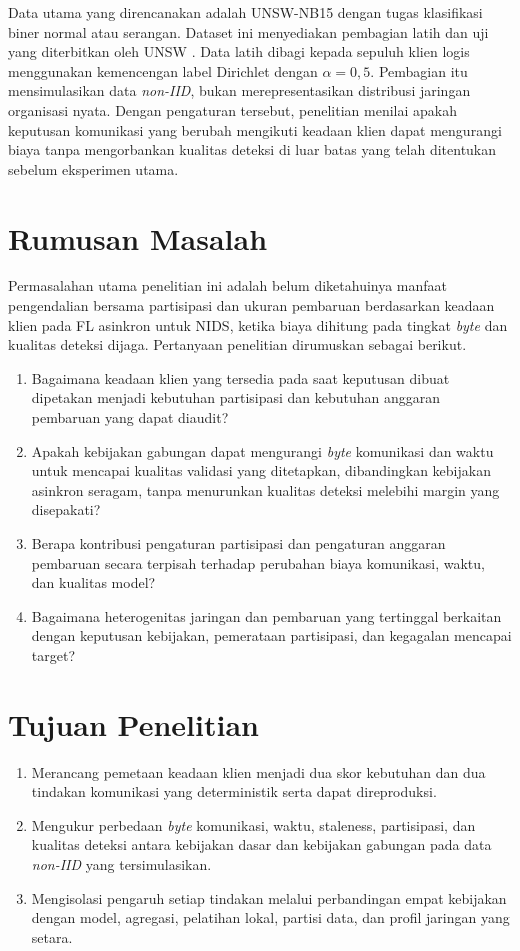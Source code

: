 Data utama yang direncanakan adalah UNSW-NB15 dengan tugas klasifikasi biner normal atau serangan. Dataset ini menyediakan pembagian latih dan uji yang diterbitkan oleh UNSW \cite{moustafa2015,unswdata}. Data latih dibagi kepada sepuluh klien logis menggunakan kemencengan label Dirichlet dengan $\alpha=0{,}5$. Pembagian itu mensimulasikan data \textit{non-IID}, bukan merepresentasikan distribusi jaringan organisasi nyata. Dengan pengaturan tersebut, penelitian menilai apakah keputusan komunikasi yang berubah mengikuti keadaan klien dapat mengurangi biaya tanpa mengorbankan kualitas deteksi di luar batas yang telah ditentukan sebelum eksperimen utama.

\section{Rumusan Masalah}
Permasalahan utama penelitian ini adalah belum diketahuinya manfaat pengendalian bersama partisipasi dan ukuran pembaruan berdasarkan keadaan klien pada FL asinkron untuk NIDS, ketika biaya dihitung pada tingkat \textit{byte} dan kualitas deteksi dijaga. Pertanyaan penelitian dirumuskan sebagai berikut.
\begin{enumerate}
  \item Bagaimana keadaan klien yang tersedia pada saat keputusan dibuat dipetakan menjadi kebutuhan partisipasi dan kebutuhan anggaran pembaruan yang dapat diaudit?
  \item Apakah kebijakan gabungan dapat mengurangi \textit{byte} komunikasi dan waktu untuk mencapai kualitas validasi yang ditetapkan, dibandingkan kebijakan asinkron seragam, tanpa menurunkan kualitas deteksi melebihi margin yang disepakati?
  \item Berapa kontribusi pengaturan partisipasi dan pengaturan anggaran pembaruan secara terpisah terhadap perubahan biaya komunikasi, waktu, dan kualitas model?
  \item Bagaimana heterogenitas jaringan dan pembaruan yang tertinggal berkaitan dengan keputusan kebijakan, pemerataan partisipasi, dan kegagalan mencapai target?
\end{enumerate}

\section{Tujuan Penelitian}
\begin{enumerate}
  \item Merancang pemetaan keadaan klien menjadi dua skor kebutuhan dan dua tindakan komunikasi yang deterministik serta dapat direproduksi.
  \item Mengukur perbedaan \textit{byte} komunikasi, waktu, staleness, partisipasi, dan kualitas deteksi antara kebijakan dasar dan kebijakan gabungan pada data \textit{non-IID} yang tersimulasikan.
  \item Mengisolasi pengaruh setiap tindakan melalui perbandingan empat kebijakan dengan model, agregasi, pelatihan lokal, partisi data, dan profil jaringan yang setara.
\end{enumerate}

